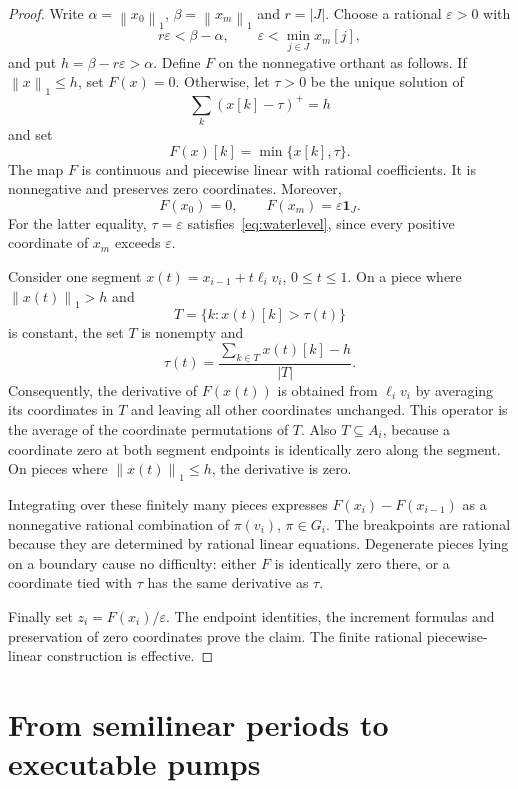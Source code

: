 \documentclass[11pt,a4paper]{article}
\theoremstyle{remark}
\newcommand{\one}{\mathbf 1}
\newcommand{\norm}[1]{\left\lVert #1\right\rVert_1}
\begin{document}
\begin{proof}
Write $\alpha=\norm{x_0}$, $\beta=\norm{x_m}$ and $r=|J|$. Choose a rational $\varepsilon>0$ with
\[
 r\varepsilon<\beta-\alpha,
 \qquad \varepsilon<\min_{j\in J}x_m[j],
\]
and put $h=\beta-r\varepsilon>\alpha$. Define $F$ on the nonnegative orthant as follows. If $\norm{x}\le h$, set $F(x)=0$. Otherwise, let $\tau>0$ be the unique solution of
\begin{equation}\label{eq:waterlevel}
 \sum_k(x[k]-\tau)^+=h
\end{equation}
and set
\begin{equation}\label{eq:F}
 F(x)[k]=\min\{x[k],\tau\}.
\end{equation}
The map $F$ is continuous and piecewise linear with rational coefficients. It is nonnegative and preserves zero coordinates. Moreover,
\[
 F(x_0)=0,\qquad F(x_m)=\varepsilon\one_J.
\]
For the latter equality, $\tau=\varepsilon$ satisfies~\eqref{eq:waterlevel}, since every positive coordinate of $x_m$ exceeds $\varepsilon$.

Consider one segment $x(t)=x_{i-1}+t\ell_i v_i$, $0\le t\le1$. On a piece where $\norm{x(t)}>h$ and
\[
 T=\{k:x(t)[k]>\tau(t)\}
\]
is constant, the set $T$ is nonempty and
\[
 \tau(t)=\frac{\sum_{k\in T}x(t)[k]-h}{|T|}.
\]
Consequently, the derivative of $F(x(t))$ is obtained from $\ell_i v_i$ by averaging its coordinates in $T$ and leaving all other coordinates unchanged. This operator is the average of the coordinate permutations of $T$. Also $T\subseteq A_i$, because a coordinate zero at both segment endpoints is identically zero along the segment. On pieces where $\norm{x(t)}\le h$, the derivative is zero.

Integrating over these finitely many pieces expresses $F(x_i)-F(x_{i-1})$ as a nonnegative rational combination of $\pi(v_i)$, $\pi\in G_i$. The breakpoints are rational because they are determined by rational linear equations. Degenerate pieces lying on a boundary cause no difficulty: either $F$ is identically zero there, or a coordinate tied with $\tau$ has the same derivative as $\tau$.

Finally set $z_i=F(x_i)/\varepsilon$. The endpoint identities, the increment formulas and preservation of zero coordinates prove the claim. The finite rational piecewise-linear construction is effective.
\end{proof}

\newpage
\section{From semilinear periods to executable pumps}
\end{document}
